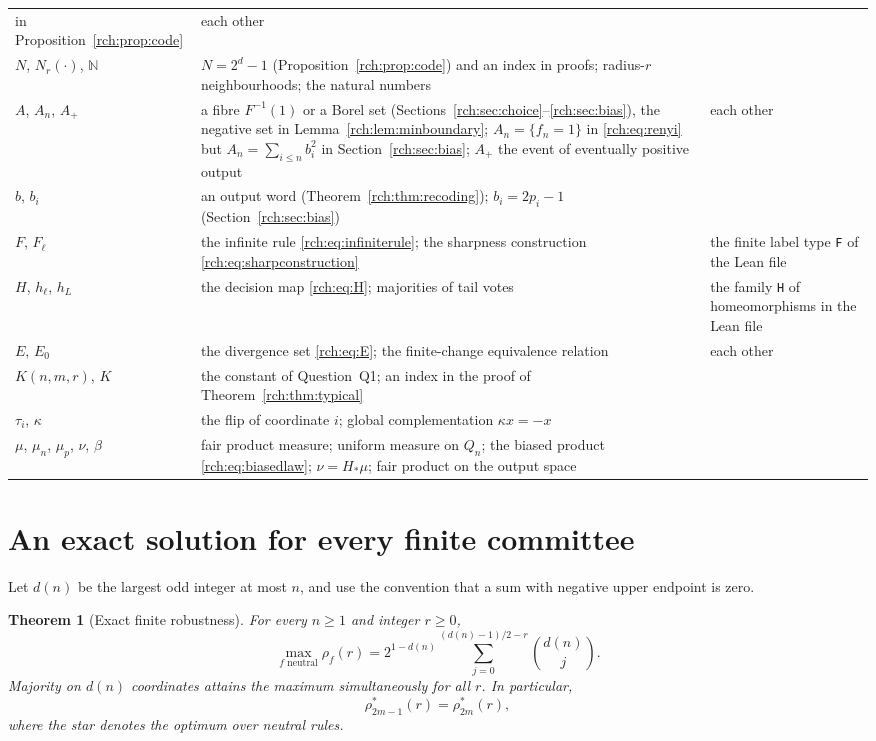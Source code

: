 \documentclass[11pt]{article}
\newtheorem{theorem}{Theorem}[section]
\theoremstyle{definition}
\theoremstyle{remark}
\newcommand{\N}{\mathbb N}
\newcommand{\flip}{\tau}
\begin{document}
\begin{center}
\begin{tabularx}{\textwidth}{@{}P{0.16\textwidth}YP{0.27\textwidth}@{}}
 in Proposition~\ref{rch:prop:code} & each other\\
$N$, $N_r(\cdot)$, $\N$ & $N=2^d-1$ (Proposition~\ref{rch:prop:code}) and an
 index in proofs; radius-$r$ neighbourhoods; the natural numbers & \\
$A$, $A_n$, $A_+$ & a fibre $F^{-1}(1)$ or a Borel set
 (Sections~\ref{rch:sec:choice}--\ref{rch:sec:bias}), the negative set in
 Lemma~\ref{rch:lem:minboundary}; $A_n=\{f_n=1\}$ in \eqref{rch:eq:renyi} but
 $A_n=\sum_{i\le n}b_i^2$ in Section~\ref{rch:sec:bias}; $A_+$ the event of
 eventually positive output & each other\\
$b$, $b_i$ & an output word (Theorem~\ref{rch:thm:recoding}); $b_i=2p_i-1$
 (Section~\ref{rch:sec:bias}) & \\
$F$, $F_\ell$ & the infinite rule \eqref{rch:eq:infiniterule}; the
 sharpness construction \eqref{rch:eq:sharpconstruction} & the finite label
 type \texttt{F} of the Lean file\\
$H$, $h_\ell$, $h_L$ & the decision map \eqref{rch:eq:H}; majorities of
 tail votes & the family \texttt{H} of homeomorphisms in the Lean file\\
$E$, $E_0$ & the divergence set \eqref{rch:eq:E}; the finite-change
 equivalence relation & each other\\
$K(n,m,r)$, $K$ & the constant of Question~Q1; an index in the proof of
 Theorem~\ref{rch:thm:typical} & \\
$\flip_i$, $\kappa$ & the flip of coordinate $i$; global complementation
 $\kappa x=-x$ & \\
$\mu$, $\mu_n$, $\mu_p$, $\nu$, $\beta$ & fair product measure; uniform
 measure on $Q_n$; the biased product \eqref{rch:eq:biasedlaw};
 $\nu=H_*\mu$; fair product on the output space & \\
\bottomrule
\end{tabularx}
\end{center}

\section{An exact solution for every finite committee}
\label{rch:sec:finite}

Let \(d(n)\) be the largest odd integer at most \(n\), and use the convention
that a sum with negative upper endpoint is zero.

\begin{theorem}[Exact finite robustness]
\label{rch:thm:finite}
For every \(n\ge1\) and integer \(r\ge0\),
\begin{equation}
 \boxed{\quad
 \max_{f\text{ neutral}}\rho_f(r)
 =2^{1-d(n)}\sum_{j=0}^{(d(n)-1)/2-r}\binom{d(n)}j.
 \quad}
 \label{rch:eq:optimum}
\end{equation}
Majority on \(d(n)\) coordinates attains the maximum simultaneously for all
\(r\). In particular,
\begin{equation}
 \rho_{2m-1}^{*}(r)=\rho_{2m}^{*}(r),
 \label{rch:eq:plateau}
\end{equation}
where the star denotes the optimum over neutral rules.
\end{theorem}
\end{document}
